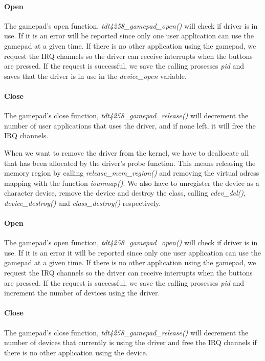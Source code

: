 \paragraph{Open} The gamepad's open function, \emph{tdt4258\_gamepad\_open()} will check if driver is in use. If it is an error will be reported since only one user application can use the gamepad at a given time. If there is no other application using the gamepad, we request the IRQ channels so the driver can receive interrupts when the buttons are pressed. If the request is successful, we save the calling prosesses \emph{pid} and saves that the driver is in use in the \emph{device\_open} variable.    

\paragraph{Close} The gamepad's close function, \emph{tdt4258\_gamepad\_release()} will decrement the number of user applications that uses the driver, and if none left, it will free the IRQ channels.

When we want to remove the driver from the kernel, we have to deallocate all that has been allocated by the driver's probe function. This means releasing the memory region by calling \emph{release\_mem\_region()} and removing the virtual adress mapping with the function \emph{iounmap()}. We also have to unregister the device as a character device, remove the device and destroy the class, calling \emph{cdev\_del()}, \emph{device\_destroy()} and \emph{class\_destroy()} respectively. 

\paragraph{Open} The gamepad's open function, \emph{tdt4258\_gamepad\_open()} will check if driver is in use. If it is an error it will be reported since only one user application can use the gamepad at a given time. If there is no other application using the gamepad, we request the IRQ channels so the driver can receive interrupts when the buttons are pressed. If the request is successful, we save the calling prosesses \emph{pid} and increment the number of devices using the driver.    
\paragraph{Close} The gamepad's close function, \emph{tdt4258\_gamepad\_release()} will decrement the number of devices that currently is using the driver and free the IRQ channels if there is no other application using the device.
